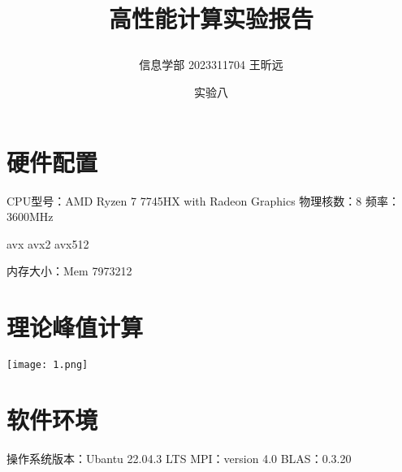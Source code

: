 \documentclass{article} %
\begin{document}
    \title{\centerline{高性能计算实验报告}}
    \date{实验八}
    \author{信息学部 2023311704 王昕远}
    \maketitle
    \thispagestyle{empty}
\section{硬件配置}%
CPU型号：AMD Ryzen 7 7745HX with Radeon Graphics 物理核数：8 频率：3600MHz\par

avx avx2 avx512\par
内存大小：Mem 7973212

\section{理论峰值计算}

\texttt{[image: 1.png]}

\section{软件环境}
操作系统版本：Ubantu 22.04.3 LTS
MPI：version 4.0
BLAS：0.3.20



$$
$$
\end{document}
